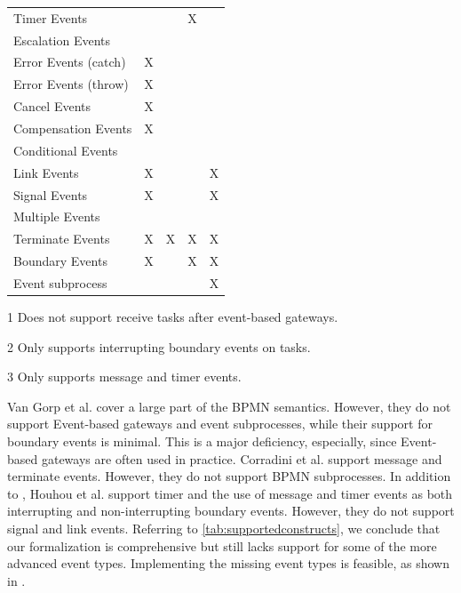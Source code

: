 \documentclass[submission, copyright, creativecommons]{eptcs}
\begin{document}
\begin{table}[htbp]
\begin{threeparttable}
\begin{tabular}{l l l l l}
      Timer Events & & & X & \\
      Escalation Events & & & & \\
      Error Events (catch) & X & & &\\
      Error Events (throw) & X & & &\\
      Cancel Events & X & & &\\
      Compensation Events & X & & &\\
      Conditional Events & & & &\\
      Link Events & X & & & X\\
      Signal Events & X & & & X\\
      Multiple Events &  & & & \\
      Terminate Events & X & X & X & X\\
     Boundary Events & X\tnote{2} & & X\tnote{3} & X\\ %
      Event subprocess &  &  &  & X\\
    \end{tabular}
    \begin{tablenotes}
        \item[1] Does not support receive tasks after event-based gateways.
        \item[2] Only supports interrupting boundary events on tasks.
        \item[3] Only supports message and timer events.
    \end{tablenotes}
    \end{threeparttable}
\end{table}

Van Gorp et al. \cite{vangorpVisualTokenbasedFormalization2013} cover a large part of the BPMN semantics.
However, they do not support Event-based gateways and event subprocesses, while their support for boundary events is minimal.
This is a major deficiency, especially, since Event-based gateways are often used in practice.
Corradini et al. \cite{corradiniFormalApproachAnalysis2021} support message and terminate events.
However, they do not support BPMN subprocesses.
In addition to \cite{corradiniFormalApproachAnalysis2021}, Houhou et al. \cite{houhouFirstOrderLogicVerification2022} support timer and the use of message and timer events as both interrupting and non-interrupting boundary events.
However, they do not support signal and link events.
Referring to \cref{tab:supportedconstructs}, we conclude that our formalization is comprehensive but still lacks support for some of the more advanced event types.
Implementing the missing event types is feasible, as shown in \cite{vangorpVisualTokenbasedFormalization2013}.
\end{document}
